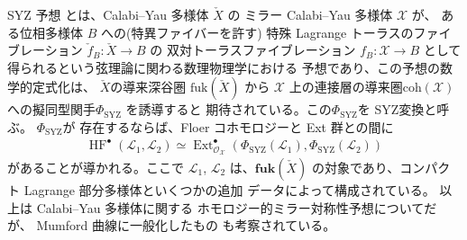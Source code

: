 \documentclass[uplatex,dvipdfmx,12pt]{jsarticle}
\numberwithin{equation}{section}
\theoremstyle{definition}
\newcommand{\opn}[1]{\operatorname{#1}}
\newcommand{\catn}[1]{\mathbf{#1}}
\begin{document}
SYZ 予想\cite{stromingerMirrorSymmetryTduality1996}
とは、Calabi--Yau 多様体 $\check{X}$ の
ミラー Calabi--Yau 多様体 $\mathcal{X}$ が、
ある位相多様体 $B$ への(特異ファイバーを許す)
特殊 Lagrange トーラスのファイブレーション
$\check{f}_{B}\colon \check{X}\to B$ の
双対トーラスファイブレーション $f_{B}\colon 
\mathcal{X}\to B$
として得られるという弦理論に関わる数理物理学における
予想であり、この予想の数学的定式化は、
$\check{X}$の導来深谷圏 $\mathrm{fuk}(\check{X})$ から
 $\mathcal{X}$ 上の連接層の導来圏$\mathrm{coh}(\mathcal{X})$
への擬同型関手$\Phi_{\mathrm{SYZ}}$ を誘導すると
期待されている。この$\Phi_{\mathrm{SYZ}}$を
SYZ変換と呼ぶ。
$\Phi_{\opn{SYZ}}$が
存在するならば、Floer コホモロジーと Ext 群との間に
\begin{align}
\opn{HF}^{\bullet}(\mathscr{L}_1,\mathscr{L}_2)
\simeq \opn{Ext}^{\bullet}_{\mathcal{O}_{\mathcal{X}}}(\Phi_{\opn{SYZ}}(\mathscr{L}_1),
\Phi_{\opn{SYZ}}(\mathscr{L}_2))
\end{align}
があることが導かれる。ここで
$\mathscr{L}_1$, $\mathscr{L}_2$ は、$\catn{fuk}(\check{X})$
の対象であり、コンパクト Lagrange 部分多様体といくつかの追加
データによって構成されている。
以上は Calabi--Yau 多様体に関する
ホモロジー的ミラー対称性予想についてだが、
Mumford 曲線に一般化したもの\cite{auroux2022lagrangian}
も考察されている。
\end{document}
